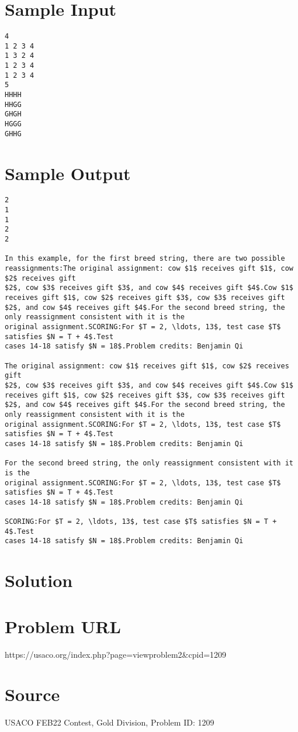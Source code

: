 \documentclass[12pt]{article}
\begin{document}
\section*{Sample Input}
\begin{verbatim}
4
1 2 3 4
1 3 2 4
1 2 3 4
1 2 3 4
5
HHHH
HHGG
GHGH
HGGG
GHHG
\end{verbatim}

\section*{Sample Output}
\begin{verbatim}
2
1
1
2
2

In this example, for the first breed string, there are two possible reassignments:The original assignment: cow $1$ receives gift $1$, cow $2$ receives gift
$2$, cow $3$ receives gift $3$, and cow $4$ receives gift $4$.Cow $1$ receives gift $1$, cow $2$ receives gift $3$, cow $3$ receives gift
$2$, and cow $4$ receives gift $4$.For the second breed string, the only reassignment consistent with it is the
original assignment.SCORING:For $T = 2, \ldots, 13$, test case $T$ satisfies $N = T + 4$.Test
cases 14-18 satisfy $N = 18$.Problem credits: Benjamin Qi

The original assignment: cow $1$ receives gift $1$, cow $2$ receives gift
$2$, cow $3$ receives gift $3$, and cow $4$ receives gift $4$.Cow $1$ receives gift $1$, cow $2$ receives gift $3$, cow $3$ receives gift
$2$, and cow $4$ receives gift $4$.For the second breed string, the only reassignment consistent with it is the
original assignment.SCORING:For $T = 2, \ldots, 13$, test case $T$ satisfies $N = T + 4$.Test
cases 14-18 satisfy $N = 18$.Problem credits: Benjamin Qi

For the second breed string, the only reassignment consistent with it is the
original assignment.SCORING:For $T = 2, \ldots, 13$, test case $T$ satisfies $N = T + 4$.Test
cases 14-18 satisfy $N = 18$.Problem credits: Benjamin Qi

SCORING:For $T = 2, \ldots, 13$, test case $T$ satisfies $N = T + 4$.Test
cases 14-18 satisfy $N = 18$.Problem credits: Benjamin Qi
\end{verbatim}

\section*{Solution}


\section*{Problem URL}
https://usaco.org/index.php?page=viewproblem2&cpid=1209

\section*{Source}
USACO FEB22 Contest, Gold Division, Problem ID: 1209
\end{document}
